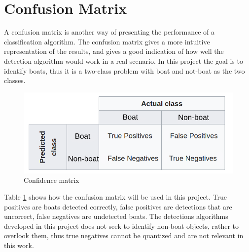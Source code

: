 \section{Confusion Matrix}
\label{sec:conf_mat}
A confusion matrix is another way of presenting the performance of a classification algorithm. The confusion matrix gives a more intuitive representation of the results, and gives a good indication of how well the detection algorithm would work in a real scenario. In this project the goal is to identify boats, thus it is a two-class problem with boat and not-boat as the two classes. 

\begin{figure}[h!]
    \centering
    \includegraphics[width = 0.7 \textwidth]{fig/conf_e.png}
    \caption{Confidence matrix}
    \label{fig:conf_exp}
\end{figure}

\newpage

Table \ref{fig:conf_exp} shows how the confusion matrix will be used in this project. True positives are boats detected correctly, false positives are detections that are uncorrect, false negatives are undetected boats. The detections algorithms developed in this project does not seek to identify non-boat objects, rather to overlook them, thus true negatives cannot be quantized and are not relevant in this work.






\cleardoublepage